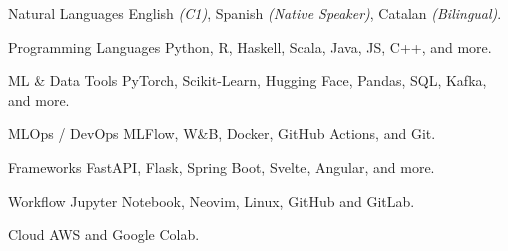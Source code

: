 

\begin{cvskills}

\cvskill
  {Natural Languages}
  {English \textit{(C1)}, Spanish \textit{(Native Speaker)}, Catalan \textit{(Bilingual)}.}

\cvskill
  {Programming Languages}
  {Python, R, Haskell, Scala, Java, JS, C++, and more.}

\cvskill
  {ML \& Data Tools}
  {PyTorch, Scikit-Learn, Hugging Face, Pandas, SQL, Kafka, and more.}

\cvskill
  {MLOps / DevOps} {MLFlow, W\&B, Docker, GitHub Actions, and Git.}

\cvskill
  {Frameworks}
  {FastAPI, Flask, Spring Boot, Svelte, Angular, and more.}


\cvskill
  {Workflow}
  {Jupyter Notebook, Neovim, Linux, GitHub and GitLab.}

\cvskill
  {Cloud}
  {AWS and Google Colab.}

\end{cvskills}
